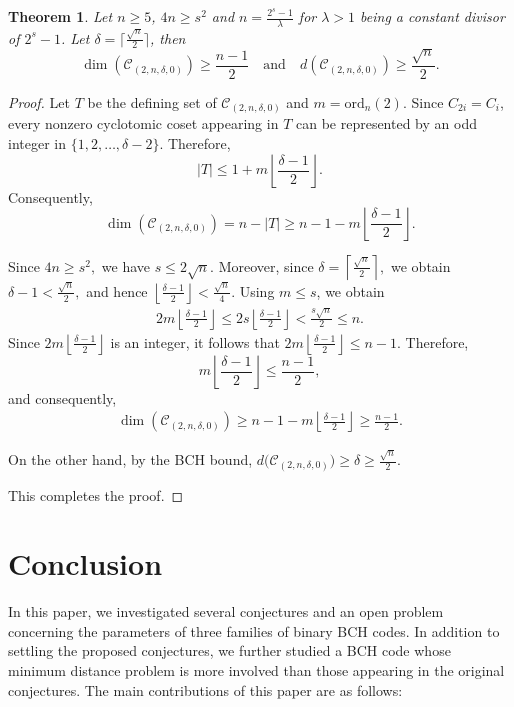 \documentclass[12pt,draftcls,journal,onecolumn]{IEEEtran}
\newtheorem{theorem}{Theorem}
\newcommand{\ord}{{\mathrm{ord}}}
\newcommand{\C}{{\mathcal{C}}}
\begin{document}
\begin{theorem}
Let $n\geq 5$, $4n\geq s^2$ and $n=\frac{2^s-1}{\lambda}$ for $\lambda>1$ being a constant divisor of $2^s-1$. Let $\delta=\lceil\frac{\sqrt n}{2}\rceil$,
then \[
\dim (\mathcal C_{(2,n,\delta,0)})\ge \frac{n-1}{2}
\quad\text{and}\quad
d(\mathcal C_{(2,n,\delta,0)})\ge \frac{\sqrt n}{2}.
\]
\end{theorem}

\begin{proof}
Let $T$ be the defining set of $\C_{(2,n,\delta,0)}$ and $m=\ord_n(2).$ Since \(C_{2i}=C_i\), every nonzero cyclotomic coset appearing in
\(T\) can be represented by an odd integer in
\(\{1,2,\ldots,\delta-2\}\). Therefore,
\[
|T|
\le
1+m\left\lfloor\frac{\delta-1}{2}\right\rfloor.
\]
Consequently,
\[
\dim (\mathcal C_{(2,n,\delta,0)})
=n-|T|
\ge
n-1-m\left\lfloor\frac{\delta-1}{2}\right\rfloor.
\]


Since
$
4n\ge s^2,
$
we have
$
s\le2\sqrt n.
$
Moreover, since
$
\delta=\left\lceil\frac{\sqrt n}{2}\right\rceil,
$
we obtain
$
\delta-1<\frac{\sqrt n}{2},
$
and hence
$
\left\lfloor\frac{\delta-1}{2}\right\rfloor
<
\frac{\sqrt n}{4}.
$
Using \(m\le s\), we obtain
\[
\begin{aligned}
2m\left\lfloor\frac{\delta-1}{2}\right\rfloor
\le
2s\left\lfloor\frac{\delta-1}{2}\right\rfloor
<
\frac{s\sqrt n}{2}
\le n.
\end{aligned}
\]
Since
$
2m\left\lfloor\frac{\delta-1}{2}\right\rfloor
$
is an integer, it follows that
$
2m\left\lfloor\frac{\delta-1}{2}\right\rfloor
\le n-1.
$
Therefore,
\[
m\left\lfloor\frac{\delta-1}{2}\right\rfloor
\le\frac{n-1}{2},
\]
and consequently,
\[
\begin{aligned}
\dim (\mathcal C_{(2,n,\delta,0)})
\ge
n-1-
m\left\lfloor\frac{\delta-1}{2}\right\rfloor\ge
\frac{n-1}{2}.
\end{aligned}
\]

On the other hand, by the BCH bound,
$
d\bigl(\mathcal C_{(2,n,\delta,0)}\bigr)
\ge\delta
\ge\frac{\sqrt n}{2}.
$

This completes the proof.
\end{proof}


\section{Conclusion}

In this paper, we investigated several conjectures and an open problem concerning the parameters of three families of binary BCH codes. In addition to settling the proposed conjectures, we further studied a BCH code whose minimum distance problem is more involved than those appearing in the original conjectures.
The main contributions of this paper are as follows:
\end{document}
